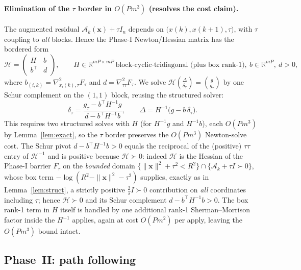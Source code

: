 \documentclass{amsart}
\newcommand{\R}{\mathbb{R}}
\begin{document}
\paragraph{Elimination of the $\tau$ border in $O(Pm^3)$ (resolves the cost claim).}
The augmented residual $\mathcal A_k(\bm x)+\tau I_n$ depends on
$\big(x(k),x(k+1),\tau\big)$, with $\tau$ coupling to \emph{all} blocks. Hence the
Phase-I Newton/Hessian matrix has the bordered form
\begin{equation}\label{eq:bordered}
  \mathcal H=\begin{pmatrix} H & b\\[2pt] b^{\!\top} & d\end{pmatrix},
  \qquad H\in\R^{mP\times mP}\ \text{block-cyclic-tridiagonal (plus box rank-1)},\
  b\in\R^{mP},\ d>0,
\end{equation}
where $b_{(i,k)}=\nabla^2_{x_i(k),\tau}F_\tau$ and $d=\nabla^2_{\tau\tau}F_\tau$. We
solve $\mathcal H\binom{\Delta}{\delta_\tau}=\binom{g}{g_\tau}$ by one Schur
complement on the $(1,1)$ block, reusing the structured solver:
\begin{equation}\label{eq:schurtau}
  \delta_\tau=\frac{g_\tau-b^{\!\top}H^{-1}g}{\,d-b^{\!\top}H^{-1}b\,},\qquad
  \Delta=H^{-1}\big(g-b\,\delta_\tau\big).
\end{equation}
This requires two structured solves with $H$ (for $H^{-1}g$ and $H^{-1}b$), each
$O(Pm^3)$ by Lemma~\ref{lem:exact}, so the $\tau$ border preserves the $O(Pm^3)$
Newton-solve cost. The Schur pivot $d-b^{\!\top}H^{-1}b>0$ equals the reciprocal of the (positive)
$\tau\tau$ entry of $\mathcal H^{-1}$ and is positive because $\mathcal
H\succ0$: indeed $\mathcal H$ is the Hessian of the Phase-I barrier $F_\tau$ on the
\emph{bounded} domain $\{\|\bm x\|^2+\tau^2<R^2\}\cap\{\mathcal A_k+\tau I\succ0\}$,
whose box term $-\log(R^2-\|\bm x\|^2-\tau^2)$ supplies, exactly as in
Lemma~\ref{lem:struct}, a strictly positive $\tfrac2sI\succ0$ contribution on
\emph{all} coordinates including $\tau$; hence $\mathcal H\succ0$ and its Schur
complement $d-b^{\!\top}H^{-1}b>0$. The box rank-1 term in $H$ itself is handled by one
additional rank-1 Sherman--Morrison factor inside the $H^{-1}$ applies, again at cost
$O(Pm^2)$ per apply, leaving the $O(Pm^3)$ bound intact.

\subsection{Phase~II: path following}
\end{document}
